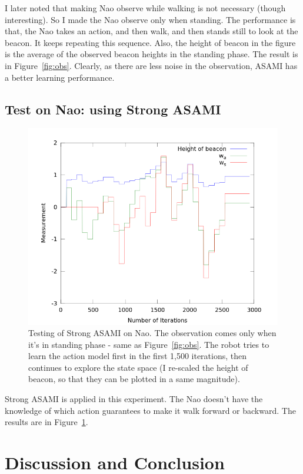 \documentclass[10pt]{IEEEtran}
\begin{document}
I later noted that making Nao observe while walking is not necessary
(though interesting). So I made the Nao observe only when standing.
The performance is that, the Nao takes an action, and then walk, and
then stands still to look at the beacon. It keeps repeating this
sequence.  Also, the height of beacon in the figure is the average of
the observed beacon heights in the standing phase. The result is in
Figure~\ref{fig:obs}. Clearly, as there are less noise in the
observation, ASAMI has a better learning performance.

\subsection{Test on Nao: using Strong ASAMI}

\begin{figure}
\centering
\includegraphics[width=\columnwidth]{out_strong.png}
\caption{Testing of Strong ASAMI on Nao. The observation comes only
when it's in standing phase - same as Figure~\ref{fig:obs}. The robot
tries to learn the action model first in the first 1,500 iterations,
then continues to explore the state space (I re-scaled the height of
beacon, so that they can be plotted in a same magnitude).}
\label{fig:obs_strong}
\end{figure}

Strong ASAMI is applied in this experiment. The Nao doesn't have the
knowledge of which action guarantees to make it walk forward or
backward. The results are in Figure~\ref{fig:obs_strong}.

\section{Discussion and Conclusion}
\label{sec:dis}
\end{document}
